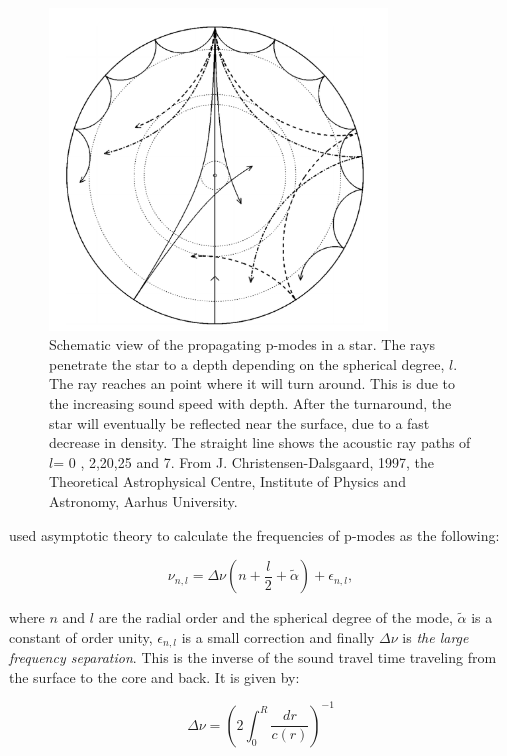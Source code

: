 \begin{figure}[t]
    \centering
    \includegraphics[width=0.8\textwidth]{propagationrays.png}
    \caption{Schematic view of the propagating p-modes in a star. The rays penetrate the star to a depth depending  on the spherical degree, $l$. The ray reaches an point where it will turn around. This is due to the increasing sound speed with depth. After the turnaround, the star will eventually be reflected near the surface, due to a fast decrease in density. The straight line shows the acoustic ray paths of $l$= 0 , 2,20,25 and 7. From J. Christensen-Dalsgaard, 1997, the Theoretical Astrophysical Centre, Institute of Physics and Astronomy, Aarhus University.}
    \label{rays}
\end{figure}

\citep{tassoul1980, tassoul1990} used asymptotic theory to calculate the frequencies of p-modes as the following: 

\begin{equation}
    \nu_{n,l} = \Delta\nu\left(n+\frac{l}{2}+\widetilde{\alpha}\right) + \epsilon_{n,l},
\end{equation}

\noindent where $n$ and $l$ are the radial order and the spherical degree of the mode, $\widetilde{\alpha}$ is a constant of order unity, $\epsilon_{n,l}$ is a small correction and finally $\Delta\nu$ is \textit{the large frequency separation}. This is the inverse of the sound travel time traveling from the surface to the core and back. It is given by: 

\begin{equation}
    \Delta\nu = \left( 2\int_{0}^{R}\frac{dr}{c(r)}\right)^{-1}
\end{equation}


